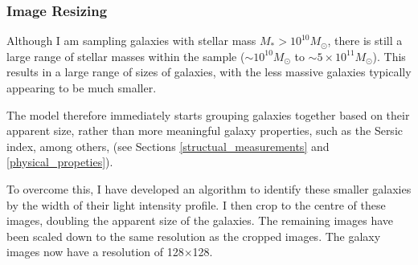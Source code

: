 \documentclass[12pt, onecolumn]{article}
\begin{document}
        \subsubsection{Image Resizing}
        

            Although I am sampling galaxies with stellar mass $M_{*} > 10^{10} M_{\odot}$, there is still a large range of stellar masses within the sample ($\sim 10^{10} M_{\odot}$ to $\sim 5\times10^{11} M_{\odot}$). This results in a large range of sizes of galaxies, with the less massive galaxies typically appearing to be much smaller.

            The model therefore immediately starts grouping galaxies together based on their apparent size, rather than more meaningful galaxy properties, such as the Sersic index, among others, (see Sections \ref{structual_measurements} and \ref{physical_propeties}).

            To overcome this, I have developed an algorithm to identify these smaller galaxies by the width of their light intensity profile. I then crop to the centre of these images, doubling the apparent size of the galaxies. The remaining images have been scaled down to the same resolution as the cropped images. The galaxy images now have a resolution of 128$\times$128.


            


\end{document}
